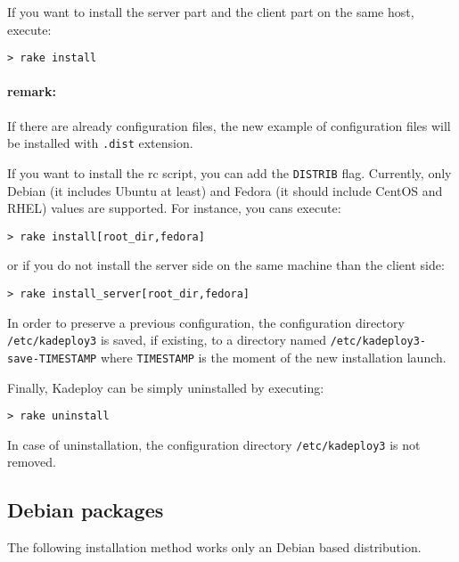 \documentclass[a4wide,10pt,oneside]{book}
\begin{document}
\noindent If you want to install the server part and the client part on the same host, execute:
\begin{small}
\begin{verbatim}
> rake install
\end{verbatim}
\end{small}

\paragraph{remark:} If there are already configuration files, the new example of configuration files will be installed with \texttt{.dist} extension.

\noindent If you want to install the rc script, you can add the \texttt{DISTRIB} flag. Currently, only Debian (it includes Ubuntu at least) and Fedora (it should include CentOS and RHEL) values are supported. For instance, you cans execute:
\begin{small}
\begin{verbatim}
> rake install[root_dir,fedora]
\end{verbatim}
\end{small}
or if you do not install the server side on the same machine than the client side:
\begin{small}
\begin{verbatim}
> rake install_server[root_dir,fedora]
\end{verbatim}
\end{small}

\noindent In order to preserve a previous configuration, the configuration directory \texttt{/etc/kadeploy3} is saved, if existing, to a directory named \texttt{/etc/kadeploy3-save-TIMESTAMP} where \texttt{TIMESTAMP} is the moment of the new installation launch.

\noindent Finally, Kadeploy can be simply uninstalled by executing:
\begin{small}
\begin{verbatim}
> rake uninstall
\end{verbatim}
\end{small}

\noindent In case of uninstallation, the configuration directory \texttt{/etc/kadeploy3} is not removed.

\subsection{Debian packages}
The following installation method works only an Debian based distribution.
\end{document}
